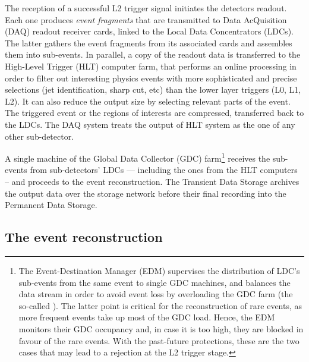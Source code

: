 The reception of a successful L2 trigger signal initiates the detectors readout. Each one produces \textit{event fragments} that are transmitted to Data AcQuisition (DAQ) readout receiver cards, linked to the Local Data Concentrators (LDCs). The latter gathers the event fragments from its associated cards and assembles them into sub-events. In parallel, a copy of the readout data is transferred to the High-Level Trigger (HLT) computer farm, that performs an online processing in order to filter out interesting physics events with more sophisticated and precise selections (jet identification, sharp \pT cut, etc) than the lower layer triggers (L0, L1, L2). It can also reduce the output size by selecting relevant parts of the event. The triggered event or the regions of interests are compressed, transferred back to the LDCs. The DAQ system treats the output of HLT system as the one of any other sub-detector.

A single machine of the Global Data Collector (GDC) farm\footnote{The Event-Destination Manager (EDM) supervises the distribution of LDC's sub-events from the same event to single GDC machines, and balances the data stream in order to avoid event loss by overloading the GDC farm (the so-called ). The latter point is critical for the reconstruction of rare events, as more frequent events take up most of the GDC load. Hence, the EDM monitors their GDC occupancy and, in case it is too high, they are blocked in favour of the rare events. With the past-future protections, these are the two cases that may lead to a rejection at the L2 trigger stage.} receives the sub-events from sub-detectors' LDCs --- including the ones from the HLT computers -- and proceeds to the event reconstruction. The Transient Data Storage archives the output data over the storage network before their final recording into the Permanent Data Storage.


\subsection{The event reconstruction}
\label{subsec:EventReco}


